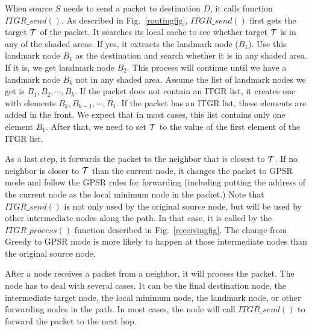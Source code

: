 \documentclass[3p,times]{elsarticle}
\begin{document}
When source $S$ needs to send a packet to destination $D$, it
calls function $ITGR\_send()$.
As described in Fig.~\ref{routingfig},
$ITGR\_send()$ first gets the target ${\cal T}$ of the packet.
It
searches its local cache to see
whether target ${\cal T}$ is in any of the shaded areas.
If yes, it extracts the landmark node ($B_1$).
Use this landmark node $B_1$ as the destination and search whether it is
in any shaded area. If it is, we get landmark node $B_2$.
This process will continue until we have a landmark node $B_k$
not in any shaded area.
Assume the list of landmark nodes we get is $B_1, B_2, \cdots, B_k$.
If the packet does not contain an ITGR list, it creates one
with elements
$B_k, B_{k-1}, \cdots, B_1$.
If the packet has an ITGR list, these elements are added in
the front.
We expect that in most cases, this list contains only one element $B_1$.
After that, we need to set ${\cal T}$ to the value of the first element
of the ITGR list.

As a last step, it forwards the packet to the neighbor
that is closest to ${\cal T}$.
If no neighbor is closer to ${\cal T}$ than the current node,
it changes the packet to GPSR mode
and follow the GPSR rules for forwarding (including putting
the address of the current node as the local minimum node in the packet.)
Note that $ITGR\_send()$ is not only used by the original source node,
but will be used by other intermediate nodes along the path.
In that case, it is called by the $ITGR\_process()$ function described in Fig.~\ref{receivingfig}.
The change from Greedy to GPSR mode is more likely to happen
at those intermediate nodes than the original source node.




After a node receives a packet from a neighbor, it will process the packet.
The node has to deal with several cases. It can be the final destination
node, the intermediate target node, the local minimum node,
the landmark node, or other forwarding nodes in the path.
In most cases, the node will call $ITGR\_send()$ to forward the packet
to the next hop.
\end{document}
